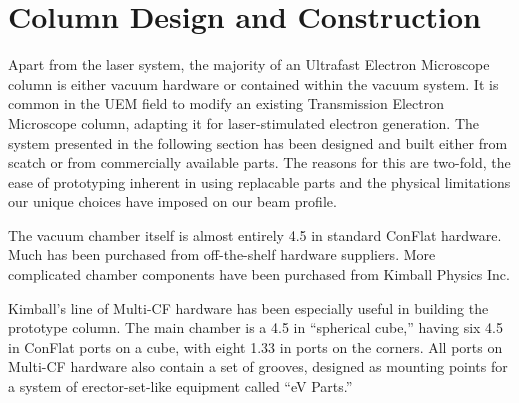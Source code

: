 \section{Column Design and Construction}

Apart from the laser system, the majority of an Ultrafast Electron Microscope column is either vacuum hardware or contained within the vacuum system.
It is common in the UEM field to modify an existing Transmission Electron Microscope column, adapting it for laser-stimulated electron generation.
The system presented in the following section has been designed and built either from scatch or from commercially available parts.
The reasons for this are two-fold, the ease of prototyping inherent in using replacable parts and the physical limitations our unique choices have imposed on our beam profile.

The vacuum chamber itself is almost entirely 4.5 in standard ConFlat hardware.
Much has been purchased from off-the-shelf hardware suppliers.
More complicated chamber components have been purchased from Kimball Physics Inc.

Kimball's line of Multi-CF hardware has been especially useful in building the prototype column.
The main chamber is a 4.5 in ``spherical cube,'' having six 4.5 in ConFlat ports on a cube, with eight 1.33 in ports on the corners.
All ports on Multi-CF hardware also contain a set of grooves, designed as mounting points for a system of erector-set-like equipment called ``eV Parts.''
